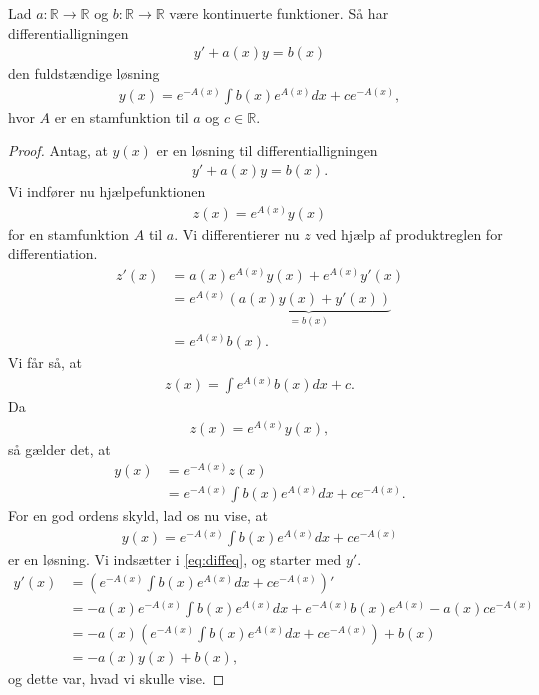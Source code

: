 \begin{setn}[Panserformlen]
	Lad $a:\mathbb{R} \to \mathbb{R}$ og $b:\mathbb{R} \to \mathbb{R}$ være kontinuerte funktioner.
	Så har differentialligningen
	\begin{align*}
		y' + a(x) y =b(x)
	\end{align*}
	den fuldstændige løsning
	\begin{align*}
		y(x) = e^{-A(x)}\int b(x)e^{A(x)} dx + ce^{-A(x)},
	\end{align*}
	hvor $A$ er en stamfunktion til $a$ og $c\in \mathbb{R}$.
\end{setn}
\begin{proof}
	Antag, at $y(x)$ er en løsning til differentialligningen
	\begin{align}\label{eq:diffeq}
		y' + a(x)y = b(x).
	\end{align}
	Vi indfører nu hjælpefunktionen 
	\begin{align*}
		z(x) = e^{A(x)}y(x)
	\end{align*}
	for en stamfunktion $A$ til $a$. 
	Vi differentierer nu $z$ ved hjælp af produktreglen for differentiation.
	\begin{align*}
		z'(x) &= a(x)e^{A(x)}y(x)+e^{A(x)}y'(x)\\
			  &= e^{A(x)}\underbrace{\left(a(x)y(x)+y'(x)\right)}_{=b(x)} \\
			  &= e^{A(x)}b(x).
	\end{align*}
	Vi får så, at 
	\begin{align*}
		z(x) = \int e^{A(x)}b(x) dx + c.
	\end{align*}
	Da 
	\begin{align*}
		z(x) = e^{A(x)}y(x),
	\end{align*}
	så gælder det, at 
	\begin{align*}
		y(x) &= e^{-A(x)}z(x)\\
		&= e^{-A(x)}\int b(x)e^{A(x)} dx + ce^{-A(x)}.
	\end{align*}
	For en god ordens skyld, lad os nu vise, at 
	\begin{align*}
		y(x) = e^{-A(x)}\int b(x)e^{A(x)}dx + ce^{-A(x)}
	\end{align*}
	er en løsning. 
	Vi indsætter i \eqref{eq:diffeq}, og starter med $y'$.
	\begin{align*}
		y'(x) &= \left(e^{-A(x)}\int b(x)e^{A(x)}dx + ce^{-A(x)}\right)' \\
		&=-a(x)e^{-A(x)}\int b(x)e^{A(x)}dx + e^{-A(x)}b(x)e^{A(x)} -a(x)ce^{-A(x)} \\
		&= -a(x)\left(e^{-A(x)}\int b(x)e^{A(x)}dx + ce^{-A(x)}\right) + b(x) \\
		&= -a(x)y(x) + b(x),
	\end{align*}
	og dette var, hvad vi skulle vise. 
\end{proof}

